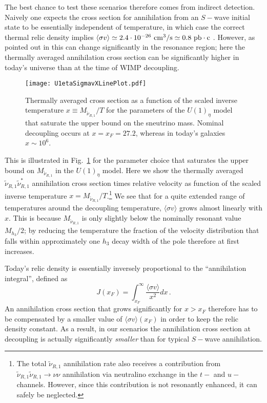 \documentclass[a4paper,11pt]{article}
\begin{document}
The best chance to test these scenarios therefore comes from indirect
detection. Naively one expects the cross section for annihilation from
an $S-$wave initial state to be essentially independent of
temperature, in which case the correct thermal relic density implies
$\langle \sigma v \rangle \simeq 2.4 \cdot 10^{-26} {\rm \text{ cm}}^3/{\rm \text{s}}
\simeq 0.8 {\rm \text{ pb}}\cdot \text{c}$ \cite{Steigman:2012nb, Drees:2015exa}.
However, as pointed out in \cite{Ibe:2008ye, Guo:2009aj} this can
change significantly in the resonance region; here the thermally
averaged annihilation cross section can be significantly higher in
today's universe than at the time of WIMP decoupling.

\begin{figure}[h!]
\centering
\texttt{[image: U1etaSigmavXLinePlot.pdf]}
\caption{Thermally averaged cross section as a function of the scaled
  inverse temperature $x \equiv M_{\tilde \nu_{R,1}}/T$ for the parameters
  of the $U(1)_\eta$ model that saturate the upper bound on the sneutrino
  mass. Nominal decoupling occurs at $x=x_F=27.2$, whereas in today's
  galaxies $x \sim 10^6$.
\label{Fig6} }
\end{figure}


This is illustrated in Fig.~\ref{Fig6} for the parameter choice that
saturates the upper bound on $M_{\tilde \nu_{R,1}}$ in the $U(1)_\eta$
model.  Here we show the thermally averaged
$\tilde \nu_{R,1} \tilde \nu_{R,1}^*$ annihilation cross section times
relative velocity as function of the scaled inverse temperature
$x = M_{\tilde \nu_{R,1}}/T$.\footnote{The total $\tilde \nu_{R,1}$
  annihilation rate also receives a contribution from
  $\tilde \nu_{R,1} \tilde \nu_{R,1} \rightarrow \nu \nu$ annihilation
  via neutralino exchange in the $t-$ and $u-$channels. However, since
  this contribution is not resonantly enhanced, it can safely be
  neglected.} We see that for a quite extended range of temperatures
around the decoupling temperature, $\langle \sigma v \rangle$ grows
almost linearly with $x$. This is because $M_{\tilde \nu_{R,1}}$ is
only slightly below the nominally resonant value $M_{h_3}/2$; by
reducing the temperature the fraction of the velocity distribution
that falls within approximately one $h_3$ decay width of the pole
therefore at first increases.

Today's relic density is essentially inversely proportional to the
``annihilation integral'', defined as \cite{Griest:1990kh}
%
\begin{equation} \label{J}
  J(x_F) = \int_{x_F}^\infty \frac { \langle \sigma v \rangle } {x^2} dx\,.
\end{equation}
%
An annihilation cross section that grows significantly for $x > x_F$
therefore has to be compensated by a smaller value of $\langle \sigma
v \rangle(x_F)$ in order to keep the relic density constant. As a result,
in our scenarios the annihilation cross section at decoupling is actually
significantly {\em smaller} than for typical $S-$wave annihilation.
\end{document}
